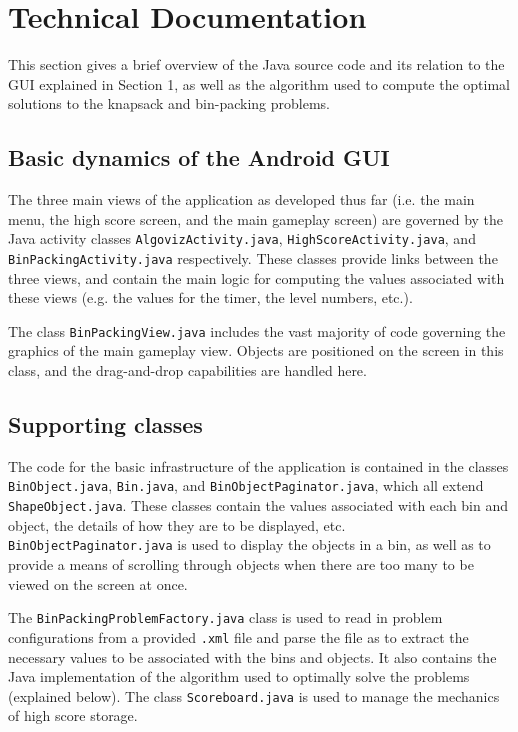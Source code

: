 \documentclass[11pt]{article}
\begin{document}
\section{Technical Documentation}

This section gives a brief overview of the Java source code and its relation to
the GUI explained in Section 1, as well as the algorithm used to compute the
optimal solutions to the knapsack and bin-packing problems.  

\subsection{Basic dynamics of the Android GUI}

The three main views of the application as developed thus far (i.e. the main
menu, the high score screen, and the main gameplay screen) are governed by the
Java activity classes \texttt{AlgovizActivity.java},
\texttt{HighScoreActivity.java}, and \texttt{BinPackingActivity.java}
respectively.  These classes provide links between the three views, and contain
the main logic for computing the values associated with these views (e.g. the
values for the timer, the level numbers, etc.).

The class \texttt{BinPackingView.java} includes the vast majority of code
governing the graphics of the main gameplay view.  Objects are positioned on
the screen in this class, and the drag-and-drop capabilities are handled here.

\subsection{Supporting classes}

The code for the basic infrastructure of the application is contained in the
classes \texttt{BinObject.java}, \texttt{Bin.java}, and
\texttt{BinObjectPaginator.java}, which all extend \texttt{ShapeObject.java}.
These classes contain the values associated with each bin and object, the
details of how they are to be displayed, etc.  \texttt{BinObjectPaginator.java}
is used to display the objects in a bin, as well as to provide a means of
scrolling through objects when there are too many to be viewed on the screen
at once.

The \texttt{BinPackingProblemFactory.java} class is used to read in problem
configurations from a provided \texttt{.xml} file and parse the file as to 
extract the necessary values to be associated with the bins and objects.  It
also contains the Java implementation of the algorithm used to optimally
solve the problems (explained below).  The class \texttt{Scoreboard.java}
is used to manage the mechanics of high score storage.
\end{document}
